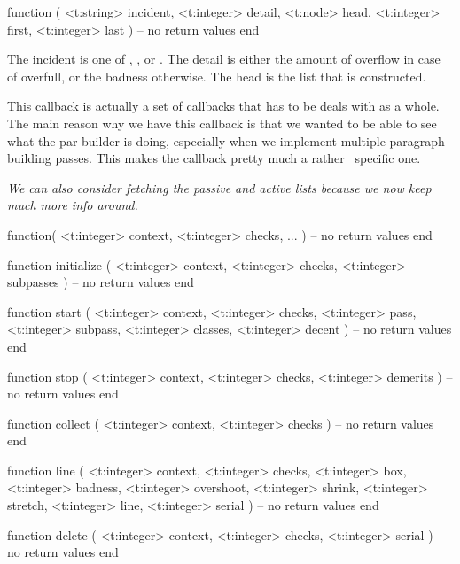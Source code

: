 \starttyping[option=LUA]
function (
    <t:string>  incident,
    <t:integer> detail,
    <t:node>    head,
    <t:integer> first,
    <t:integer> last
)
    -- no return values
end
\stoptyping

The incident is one of , ,  or
. The detail is either the amount of overflow in case of \type
{overfull}, or the badness otherwise. The head is the list that is constructed.

\stopsubsection

\startsubsection[title=line_break]

This callback is actually a set of callbacks that has to be deals with as a
whole. The main reason why we have this callback is that we wanted to be able to
see what the par builder is doing, especially when we implement multiple
paragraph building passes. This makes the callback pretty much a rather \CONTEXT\
specific one.

{\em We can also consider fetching the passive and active lists because we now keep
much more info around.}

\starttyping[option=LUA]
function(
    <t:integer> context,
    <t:integer> checks,
    ...
)
    -- no return values
end
\stoptyping

\starttyping[option=LUA]
function initialize (
    <t:integer> context,
    <t:integer> checks,
    <t:integer> subpasses
)
    -- no return values
end
\stoptyping

\starttyping[option=LUA]
function start (
    <t:integer> context,
    <t:integer> checks,
    <t:integer> pass,
    <t:integer> subpass,
    <t:integer> classes,
    <t:integer> decent
)
    -- no return values
end
\stoptyping

\starttyping[option=LUA]
function stop (
    <t:integer> context,
    <t:integer> checks,
    <t:integer> demerits
)
    -- no return values
end
\stoptyping

\starttyping[option=LUA]
function collect (
    <t:integer> context,
    <t:integer> checks
)
    -- no return values
end
\stoptyping

\starttyping[option=LUA]
function line (
    <t:integer> context,
    <t:integer> checks,
    <t:integer> box,
    <t:integer> badness,
    <t:integer> overshoot,
    <t:integer> shrink,
    <t:integer> stretch,
    <t:integer> line,
    <t:integer> serial
)
    -- no return values
end
\stoptyping

\starttyping[option=LUA]
function delete (
    <t:integer> context,
    <t:integer> checks,
    <t:integer> serial
)
    -- no return values
end
\stoptyping

